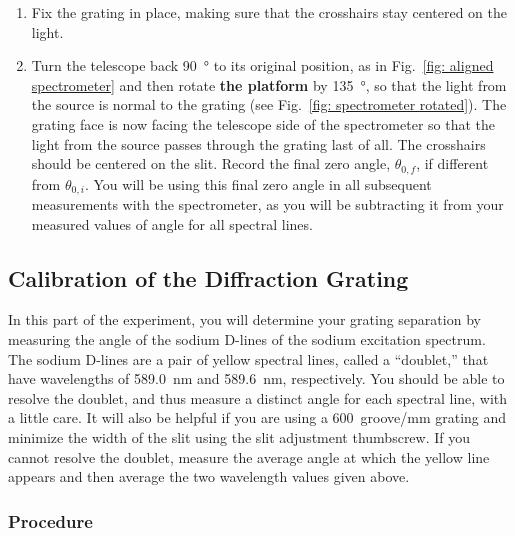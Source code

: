 \documentclass[addpoints]{physlabs}
\begin{document}
\begin{labsection}
\begin{experiment}
\begin{enumerate}
    \item Fix the grating in place, making sure that the crosshairs stay centered on the light.

    \item \label{step: rotate 3} Turn the telescope back \qty{90}{\degree} to its original position, as in Fig.~\ref{fig: aligned spectrometer} and then rotate \textbf{the platform} by \qty{135}{\degree}, so that the light from the source is normal to the grating (see Fig.~\ref{fig: spectrometer rotated}). The grating face is now facing the telescope side of the spectrometer so that the light from the source passes through the grating last of all. The crosshairs should be centered on the slit. Record the final zero angle, $\theta_{0,f}$, if different from $\theta_{0,i}$. You will be using this final zero angle in all subsequent measurements with the spectrometer, as you will be subtracting it from your measured values of angle for all spectral lines.
    
\end{enumerate}

\subsection*{Calibration of the Diffraction Grating}

In this part of the experiment, you will determine your grating separation by measuring the angle of the sodium D-lines of the sodium excitation spectrum. The sodium D-lines are a pair of yellow spectral lines, called a ``doublet,'' that have wavelengths of \qty{589.0}{\nano\meter} and \qty{589.6}{\nano\meter}, respectively. You should be able to resolve the doublet, and thus measure a distinct angle for each spectral line, with a little care. It will also be helpful if you are using a 600~groove/mm grating and minimize the width of the slit using the slit adjustment
thumbscrew. If you cannot resolve the doublet, measure the average angle at which the yellow line appears and then average the two wavelength values given above.

\subsubsection*{Procedure}


\end{experiment}
\end{labsection}
\end{document}
